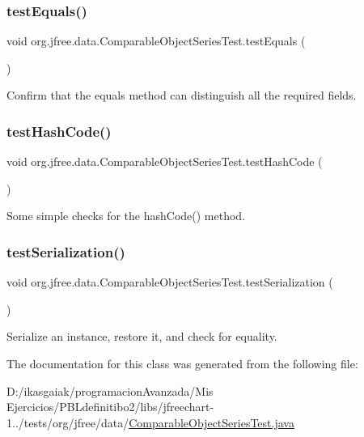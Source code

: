 \subsubsection{\texorpdfstring{test\+Equals()}{testEquals()}}
{\footnotesize\ttfamily void org.\+jfree.\+data.\+Comparable\+Object\+Series\+Test.\+test\+Equals (\begin{DoxyParamCaption}{ }\end{DoxyParamCaption})}

Confirm that the equals method can distinguish all the required fields. \mbox{\label{classorg_1_1jfree_1_1data_1_1_comparable_object_series_test_a94c8ef8ac1cd96aa87b0a19f87798db1}} 
\subsubsection{\texorpdfstring{test\+Hash\+Code()}{testHashCode()}}
{\footnotesize\ttfamily void org.\+jfree.\+data.\+Comparable\+Object\+Series\+Test.\+test\+Hash\+Code (\begin{DoxyParamCaption}{ }\end{DoxyParamCaption})}

Some simple checks for the hash\+Code() method. \mbox{\label{classorg_1_1jfree_1_1data_1_1_comparable_object_series_test_a7f8bdaf9759c8dc4e9cd1e46995fe224}} 
\subsubsection{\texorpdfstring{test\+Serialization()}{testSerialization()}}
{\footnotesize\ttfamily void org.\+jfree.\+data.\+Comparable\+Object\+Series\+Test.\+test\+Serialization (\begin{DoxyParamCaption}{ }\end{DoxyParamCaption})}

Serialize an instance, restore it, and check for equality. 

The documentation for this class was generated from the following file\+:\begin{DoxyCompactItemize}
\item 
D\+:/ikasgaiak/programacion\+Avanzada/\+Mis Ejercicios/\+P\+B\+Ldefinitibo2/libs/jfreechart-\/1../tests/org/jfree/data/\mbox{\hyperlink{_comparable_object_series_test_8java}{Comparable\+Object\+Series\+Test.\+java}}\end{DoxyCompactItemize}
